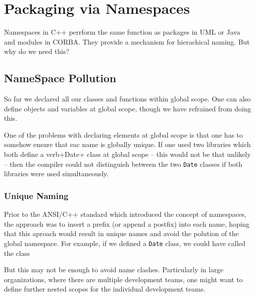 \chapter{Packaging via Namespaces \label{chapNameSpaces}}

Namespaces in C++ perrform the same function as packages in UML
or Java and modules in CORBA. They provide a mechanism for hierachical
naming. But why do we need this?


\section{NameSpace Pollution}

So far we declared all our classes and functions within global scope.
One can also define objects and variables at global scope, though we
have refrained from doing this.

One of the problems with declaring elements at global scope is that
one has to somehow ensure that eac name is globally unique. If one
used two libraries which both define a verb+Date+ class at global scope
-- this would not be that unlikely -- then the compiler could not 
distinguish between the two \verb+Date+ classes if both libraries
were used simultaneously.


\subsection{Unique Naming}

Prior to
the ANSI/C++ standard which introduced the concept of namespaces, the
approach was to insert a prefix (or append a postfix) into each name,
hoping that this aproach would result in unique names and avoid
the polution of the global namespace. For example, if we defined a
\verb+Date+ class, we could have called the class


But this may not be enough to avoid name clashes. Particularly in large
organizations, where there are multiple development teams, one might
want to define further nested scopes for the individual development 
teams. 

